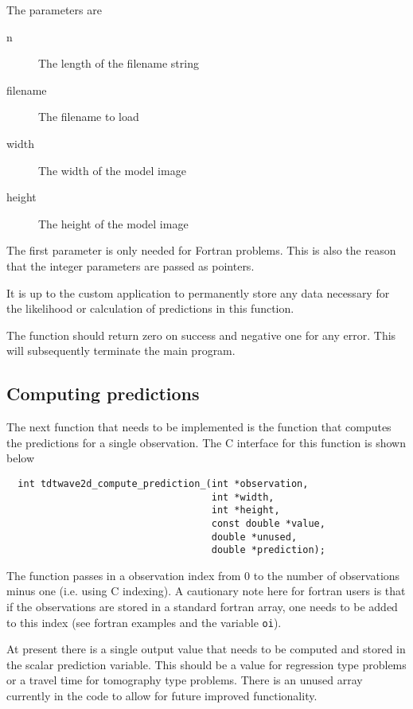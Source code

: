 \documentclass[a4paper,12pt]{article}
\begin{document}
The parameters are

\begin{description}
\item[n] The length of the filename string
\item[filename] The filename to load
\item[width] The width of the model image
\item[height] The height of the model image
\end{description}

The first parameter is only needed for Fortran problems. This is also
the reason that the integer parameters are passed as pointers.

It is up to the custom application to permanently store any data
necessary for the likelihood or calculation of predictions in this
function.

The function should return zero on success and negative one for any
error.  This will subsequently terminate the main program.

\subsection{Computing predictions}

The next function that needs to be implemented is the function that
computes the predictions for a single observation. The C interface for
this function is shown below


\begin{verbatim}
  int tdtwave2d_compute_prediction_(int *observation,
                                    int *width, 
                                    int *height,
                                    const double *value,
                                    double *unused,
                                    double *prediction);
\end{verbatim}

The function passes in a observation index from 0 to the number of
observations minus one (i.e. using C indexing). A cautionary note here
for fortran users is that if the observations are stored in a standard
fortran array, one needs to be added to this index (see fortran
examples and the variable {\tt oi}).

At present there is a single output value that needs to be computed and
stored in the scalar prediction variable. This should be a value for regression
type problems or a travel time for tomography type problems. There is an unused
array currently in the code to allow for future improved functionality.
\end{document}

